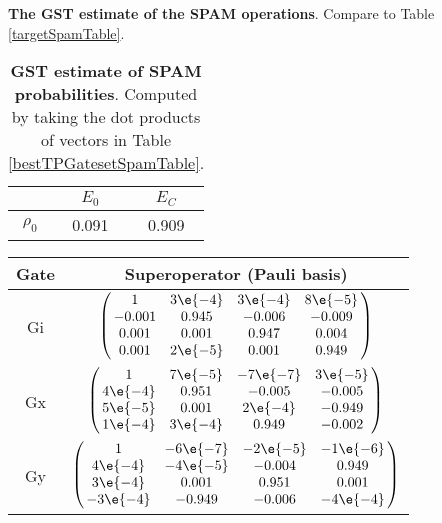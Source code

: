 {\begin{table}[h]
\begin{center}
\caption{\textbf{The GST estimate of the SPAM operations}.  Compare to Table \ref{targetSpamTable}.\label{bestTPGatesetSpamTable}}
\end{center}
\end{table}

\begin{table}[h]
\begin{center}
\begin{tabular}[l]{|c|c|c|}
\hline
 & $E_{0}$ & $E_C$ \\ \hline
$\rho_{0}$ & 0.091 & 0.909 \\ \hline
\end{tabular}

\caption{\textbf{GST estimate of SPAM probabilities}.  Computed by taking the dot products of vectors in Table \ref{bestTPGatesetSpamTable}.\label{bestTPGatesetSpamParametersTable}}
\end{center}
\end{table}

\begin{table}[h]
\begin{center}
\begin{tabular}[l]{|c|c|}
\hline
Gate & Superoperator (Pauli basis) \\ \hline
Gi & $ \left(\!\!\begin{array}{cccc}
1 & 3\e{-4} & 3\e{-4} & 8\e{-5} \\ 
-0.001 & 0.945 & -0.006 & -0.009 \\ 
0.001 & 0.001 & 0.947 & 0.004 \\ 
0.001 & 2\e{-5} & 0.001 & 0.949
 \end{array}\!\!\right) $
 \\ \hline
Gx & $ \left(\!\!\begin{array}{cccc}
1 & 7\e{-5} & -7\e{-7} & 3\e{-5} \\ 
4\e{-4} & 0.951 & -0.005 & -0.005 \\ 
5\e{-5} & 0.001 & 2\e{-4} & -0.949 \\ 
1\e{-4} & 3\e{-4} & 0.949 & -0.002
 \end{array}\!\!\right) $
 \\ \hline
Gy & $ \left(\!\!\begin{array}{cccc}
1 & -6\e{-7} & -2\e{-5} & -1\e{-6} \\ 
4\e{-4} & -4\e{-5} & -0.004 & 0.949 \\ 
3\e{-4} & 0.001 & 0.951 & 0.001 \\ 
-3\e{-4} & -0.949 & -0.006 & -4\e{-4}
 \end{array}\!\!\right) $
 \\ \hline
\end{tabular}


\end{center}
\end{table}}
